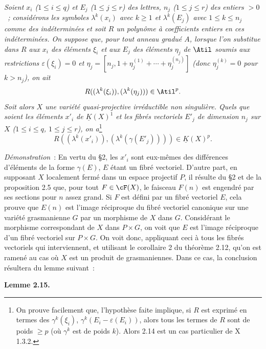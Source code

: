 \emph{Soient $x_i$ ($1\leq i\leq q$) et $E_j$ ($1\leq j\leq r$) des lettres, $n_j$ ($1\leq j\leq r$) des entiers $>0$~; considérons les symboles $\lambda^k(x_i)$ avec $k\geq1$ et $\lambda^k(E_j)$ avec $1\leq k\leq n_j$ comme des indéterminées et soit $R$ un polynôme à coefficients entiers en ces indéterminées. On suppose que, pour tout anneau gradué $A$, lorsque l'on substitue dans $R$ aux $x_i$ des éléments $\xi_i$ et aux $E_j$ des éléments $\eta_j$ de $\Atil$ soumis aux restrictions $\varepsilon(\xi_i)=0$ et $\eta_j=[n_j,1+\eta_j^{(1)}+\cdots+\eta_j^{(n_j)}]$ (donc $\eta_j^{(k)}=0$ pour $k>n_j$), on ait}
\[
 R((\lambda^k(\xi_i)),(\lambda^k(\eta_j)))\in\Atil^p.
\]
\emph{Soit alors $X$ une variété quasi-projective irréductible non singulière. Quels que soient les éléments $x'_i$ de $\underline K(X)^1$ et les fibrés vectoriels $E'_j$ de dimension $n_j$ sur $X$ ($1\leq i\leq q$, $1\leq j\leq r$), on a}\footnote{On prouve facilement que, l'hypothèse faite implique, si $R$ est exprimé en termes des $\gamma^k(\xi_i)$, $\gamma^k(E_i-\varepsilon(E_i))$, alors tous les termes de $R$ sont de poids $\geq p$ (où $\gamma^k$ est de poids $k$). Alors 2.14 est un cas particulier de X 1.3.2.}
\begin{equation}\tag{*}
 R((\lambda^k(x'_i)),(\lambda^k(\gamma(E'_j))))\in\underline K(X)^p.
\end{equation}

\emph{Démonstration}~: En vertu du \S 2, les $x'_i$ sont eux-mêmes des différences d'éléments de la forme $\gamma(E)$, $E$ étant un fibré vectoriel. D'autre part, en supposant $X$ localement fermé dans un espace projectif $P$, il résulte du \S 2 et de la proposition 2.5 que, pour tout $F\in\cF(X)$, le faisceau $F(n)$ est engendré par ses sections pour $n$ assez grand. Si $F$ est défini par un fibré vectoriel $E$, cela prouve que $E(n)$ est l'image réciproque du fibré vectoriel canonique sur une variété grasmanienne $G$ par un morphisme de $X$ dans $G$. Considérant le morphisme correspondant de $X$ dans $P\times G$, on voit que $E$ est l'image réciproque d'un fibré vectoriel sur $P\times G$. On voit donc, appliquant ceci à tous les fibrés vectoriels qui interviennent, et utilisant le corollaire 2 du théorème 2.12, qu'on est ramené au cas où $X$ est un produit de grasmaniennes. Dans ce cas, la conclusion résultera du lemme suivant~:

\textbf{Lemme 2.15.}
